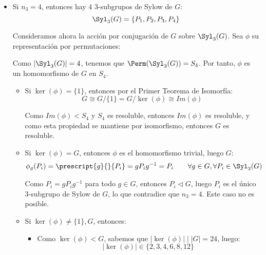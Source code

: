 \begin{ejercicio}
\begin{enumerate}
\begin{itemize}
            \item Si $n_3=4$, entonces hay $4$ $3$-subgrupos de Sylow de $G$:
            \begin{equation*}
                \Syl_3(G) = \{P_1, P_2, P_3, P_4\}
            \end{equation*}

            Consideramos ahora la acción por conjugación de $G$ sobre $\Syl_3(G)$. Sea $\phi$ su representación por permutaciones:

            Como $|\Syl_3(G)|=4$, tenemos que $\Perm(\Syl_3(G))=S_4$. Por tanto, $\phi$ es un homomorfismo de $G$ en $S_4$.
            \begin{itemize}
                \item Si $\ker(\phi)=\{1\}$, entonces por el Primer Teorema de Isomorfía:
                \begin{equation*}
                    G \cong G/\{1\} = G/\ker(\phi) \cong Im(\phi)
                \end{equation*}

                Como $Im(\phi)< S_4$ y $S_4$ es resoluble, entonces $Im(\phi)$ es resoluble, y como esta propiedad se mantiene por isomorfismo, entonces $G$ es resoluble.

                \item Si $\ker(\phi)=G$, entonces $\phi$ es el homomorfismo trivial, luego $G$:
                \begin{align*}
                    \phi_g(P_i) = \prescript{g}{}{P_i} = gP_i g^{-1} = P_i\qquad \forall g\in G, \forall P_i\in \Syl_3(G)
                \end{align*}

                Como $P_i=gP_i g^{-1}$ para todo $g\in G$, entonces $P_i\lhd G$, luego $P_i$ es el único $3$-subgrupo de Sylow de $G$, lo que contradice que $n_3=4$. Este caso no es posible.

                \item Si $\ker(\phi)\neq \{1\},G$, entonces:
                \begin{itemize}
                    \item Como $\ker(\phi)<G$, sabemos que $|\ker(\phi)|\mid |G|=24$, luego:
                    \begin{equation*}
                        |\ker(\phi)|\in \{2,3,4,6,8,12\}
                    \end{equation*}


\end{itemize}
\end{itemize}
\end{itemize}
\end{enumerate}
\end{ejercicio}

